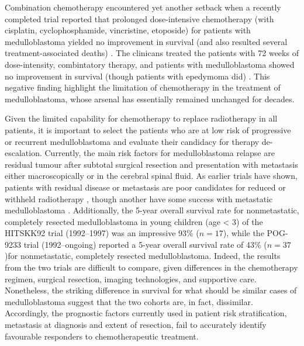 Combination chemotherapy encountered yet another setback when a recently completed trial reported that prolonged dose-intensive chemotherapy (with cisplatin, cyclophosphamide, vincristine, etoposide) for patients with medulloblastoma yielded no improvement in survival (and also resulted several treatment-associated deaths) . The clinicans treated the patients with 72 weeks of dose-intensity, combintatory therapy, and patients with medulloblastoma showed no improvement in survival (though patients with epedymoma did) . This negative finding highlight the limitation of chemotherapy in the treatment of medulloblastoma, whose arsenal has essentially remained unchanged for decades.

Given the limited capability for chemotherapy to replace radiotherapy in all patients, it is important to select the patients who are at low risk of progressive or recurrent medulloblastoma and evaluate their candidacy for therapy de-escalation. Currently, the main risk factors for medulloblastoma relapse are residual tumour after subtotal surgical resection and presentation with metastasis either macroscopically or in the cerebral spinal fluid. As earlier trials have shown, patients with residual disease or metastasis are poor candidates for reduced or withheld radiotherapy , though another have some success with metastatic medulloblastoma . Additionally, the 5-year overall survival rate for nonmetastatic, completely resected medulloblastoma in young children (age < 3) of the HITSKK92 trial (1992--1997) was an impressive 93\% ($n = 17$), while the POG-9233 trial (1992--ongoing) reported a 5-year overall survival rate of 43\% ($n = 37$)for nonmetastatic, completely resected medulloblastoma. Indeed, the results from the two trials are difficult to compare, given differences in the chemotherapy regimen, surgical resection, imaging technologies, and supportive care. Nonetheless, the striking difference in survival for what should be similar cases of medulloblastoma suggest that the two cohorts are, in fact, dissimilar. Accordingly, the prognostic factors currently used in patient risk stratification, metastasis at diagnosis and extent of resection, fail to accurately identify favourable responders to chemotherapeutic treatment.

